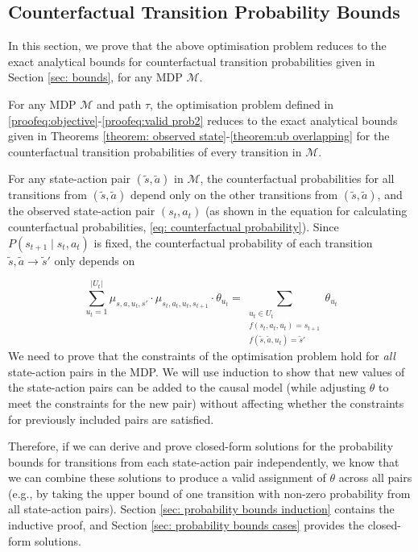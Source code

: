 \subsection{Counterfactual Transition Probability Bounds}
\label{sec: probability bounds proof}

In this section, we prove that the above optimisation problem reduces to the exact analytical bounds for counterfactual transition probabilities given in Section \ref{sec: bounds}, for any MDP $\mathcal{M}$.

\begin{theorem}
    For any MDP $\mathcal{M}$ and path $\tau$, the optimisation problem defined in \eqref{proofeq:objective}-\eqref{proofeq:valid prob2} reduces to the exact analytical bounds given in Theorems \ref{theorem: observed state}-\ref{theorem:ub overlapping} for the counterfactual transition probabilities of every transition in $\mathcal{M}$.
\end{theorem}

For any state-action pair $(\tilde{s}, \tilde{a})$ in $\mathcal{M}$, the counterfactual probabilities for all transitions from $(\tilde{s}, \tilde{a})$ depend only on the other transitions from $(\tilde{s}, \tilde{a})$, and the observed state-action pair $(s_t, a_t)$ (as shown in the equation for calculating counterfactual probabilities, \eqref{eq: counterfactual probability}). Since $P(s_{t+1} \mid s_t, a_t)$ is fixed, the counterfactual probability of each transition $\tilde{s}, \tilde{a} \rightarrow \tilde{s}'$ only depends on 

\[\sum_{u_t = 1}^{|U_t|} \mu_{s, a, u_t, s'} \cdot \mu_{s_t, a_t, u_t, s_{t+1}} \cdot \theta_{u_t} = \sum_{\substack{u_t \in U_t \\f(s_t, a_t, u_t) = s_{t+1} \\ f(\tilde{s}, \tilde{a}, u_t) = \tilde{s}'}} \theta_{u_t}\]
We need to prove that the constraints of the optimisation problem hold for \textit{all} state-action pairs in the MDP. We will use induction to show that new values of the state-action pairs can be added to the causal model (while adjusting $\theta$ to meet the constraints for the new pair) without affecting whether the constraints for previously included pairs are satisfied.

Therefore, if we can derive and prove closed-form solutions for the probability bounds for transitions from each state-action pair independently, we know that we can combine these solutions to produce a valid assignment of $\theta$ across all pairs (e.g., by taking the upper bound of one transition with non-zero probability from all state-action pairs). Section \ref{sec: probability bounds induction} contains the inductive proof, and Section \ref{sec: probability bounds cases} provides the closed-form solutions.

